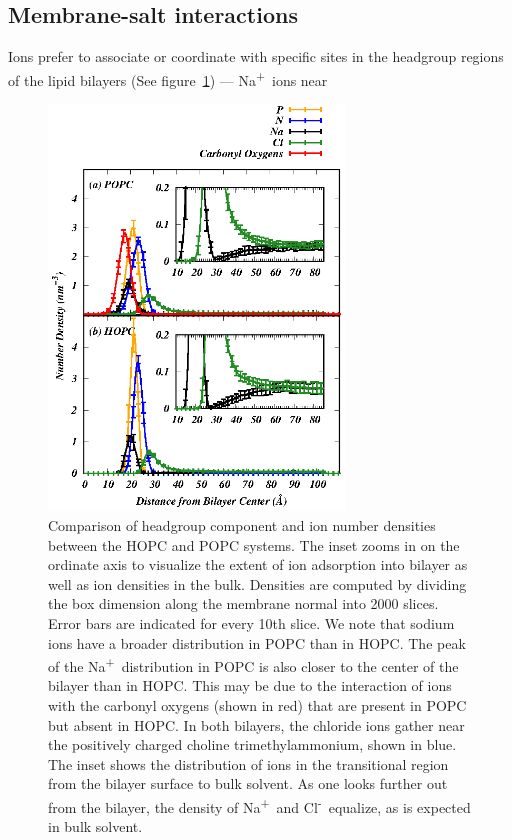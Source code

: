 \documentclass[12pt,openany,final]{book}
\newcommand{\na}{Na\textsuperscript{+}~}
\newcommand{\cl}{Cl\textsuperscript{-}~}
\begin{document}
\subsection{Membrane-salt interactions}

Ions prefer to associate or coordinate with specific sites 
in the headgroup regions of the lipid bilayers (See figure~\ref{fig:numberdens}) --- \na ions near 
\begin{figure}[p]
    \caption[Comparison of headgroup component and ion number densities between the HOPC and POPC systems.]{ 
Comparison of headgroup component and ion number densities between the HOPC and POPC systems. The 
inset zooms in on the ordinate axis to visualize the extent of ion 
adsorption into bilayer as well as ion densities in the bulk. Densities are computed by dividing 
the box dimension along the membrane normal into 2000 slices. Error bars are indicated for every 10th slice. 
We note that sodium ions have a broader distribution in POPC than in HOPC. The peak of the \na distribution in 
POPC is also closer to the center of the bilayer than in HOPC. This may be due 
to the interaction of ions with the carbonyl oxygens (shown in red) 
that are present in POPC but absent in HOPC. In both bilayers, the chloride ions 
gather near the positively charged choline trimethylammonium, shown in blue. The 
inset shows the distribution of ions in the transitional region from the bilayer surface to bulk solvent. As one 
looks further out from the bilayer, the density of \na and \cl equalize, as is expected in bulk solvent. 
}
\label{fig:numberdens}
\includegraphics[width=	0.7\textwidth]{density.eps}
\end{figure}
\end{document}
